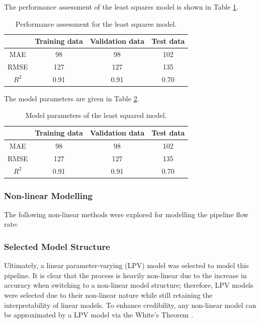 The performance assessment of the least squares model is shown in Table \ref{tab:08LSperformance}.

\begin{table}[h]
    \centering
    {
    \begin{tabular}{ c | c | c | c}
                             &  Training data    &  Validation data   &    Test data      \\
        \hline
        MAE                  &  98               &    98              &  102     \\
        RMSE                 &  127              &   127              &  135    \\ 
        $R^2$                &  0.91             &   0.91             &  0.70   \\
    \end{tabular}}
    \caption{Performance assessment for the least squares model.}
    \label{tab:08LSperformance}
\end{table}

The model parameters are given in Table \ref{tab:08paramLS}.

\begin{table}[h]
    \centering
    {
    \begin{tabular}{ c | c | c | c}
                             &  Training data    &  Validation data   &    Test data      \\
        \hline
        MAE                  &  98               &    98              &  102     \\
        RMSE                 &  127              &   127              &  135    \\ 
        $R^2$                &  0.91             &   0.91             &  0.70   \\
    \end{tabular}}
    \caption{Model parameters of the least squared model.}
    \label{tab:08paramLS}
\end{table}




\subsubsection{Non-linear Modelling}
The following non-linear methods were explored for modelling the pipeline flow rate:

\subsubsection{Selected Model Structure}
Ultimately, a linear parameter-varying (LPV) model was selected to model this pipeline.  It is clear that the process is heavily non-linear due to the increase in accuracy when switching to a non-linear model structure; therefore, LPV models were selected due to their non-linear nature while still retaining the interpretability of linear models. To enhance credibility, any non-linear model can be approximated by a LPV model via the White's Theorem \cite{LPV}.

